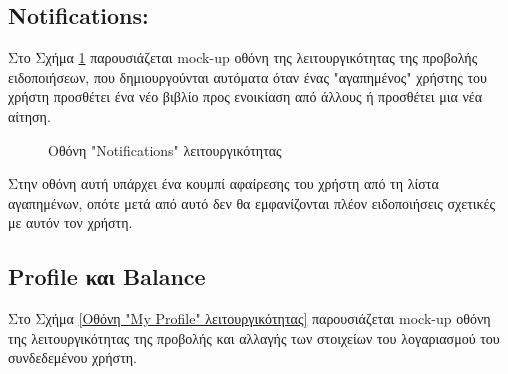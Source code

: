 \documentclass[12pt,a4paper]{article}
\begin{document}
\subsection{Notifications:}

Στο Σχήμα \ref{Οθόνη "Notifications" λειτουργικότητας} παρουσιάζεται mock-up οθόνη της λειτουργικότητας της προβολής ειδοποιήσεων, που δημιουργούνται αυτόματα όταν ένας "αγαπημένος" χρήστης του χρήστη προσθέτει ένα νέο βιβλίο προς ενοικίαση από άλλους ή προσθέτει μια νέα αίτηση.

\begin{figure}[H]
	\caption{Οθόνη "Notifications" λειτουργικότητας}
	\label{Οθόνη "Notifications" λειτουργικότητας}
\end{figure}

Στην οθόνη αυτή υπάρχει ένα κουμπί αφαίρεσης του χρήστη από τη λίστα αγαπημένων, οπότε μετά από αυτό δεν θα εμφανίζονται πλέον ειδοποιήσεις σχετικές με αυτόν τον χρήστη.

\subsection{Profile και Balance}

Στο Σχήμα \ref{Οθόνη "My Profile" λειτουργικότητας} παρουσιάζεται mock-up οθόνη της λειτουργικότητας της προβολής και αλλαγής των στοιχείων του λογαριασμού του συνδεδεμένου χρήστη.
\end{document}
